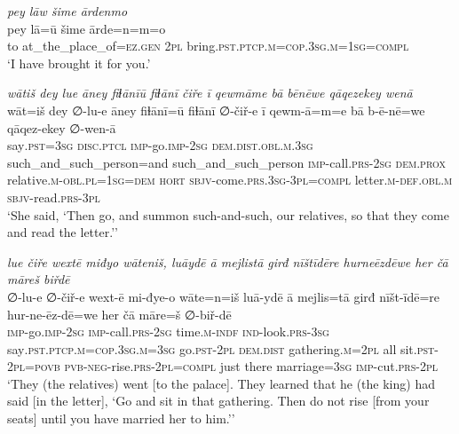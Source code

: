 \ea \label{KŠ.85}
\textit{pey lāw šime ārdenmo} \\ 
\gll pey lā=ū šime ārde=n=m=o \\ 
 to at\_the\_place\_of\textsc{\textsc{=ez.gen}} \textsc{2pl} bring\textsc{.pst}\textsc{.ptcp}\textsc{.m}\textsc{=cop}\textsc{.3sg}\textsc{.m}\textsc{=\textsc{1sg}}\textsc{=compl} \\ 
\glt `I have brought it for you.'
\z 
 
\ea \label{KŠ.86}
\textit{wātiš dey lue āney fiɫānīū fiɫānī čiře ī qewmāme bā bēnēwe qāqezekey wenā} \\ 
\gll wāt=iš dey ∅-lu-e āney fiɫānī=ū fiɫānī ∅-čiř-e ī qewm-ā=m=e bā b-ē-nē=we qāqez-ekey ∅-wen-ā \\ 
 say\textsc{.pst}\textsc{=3sg} \textsc{disc.ptcl} \textsc{imp-}go.\textsc{imp-}\textsc{2sg} \textsc{dem.dist}\textsc{.obl}\textsc{.m}\textsc{.3sg} such\_and\_such\_person=and such\_and\_such\_person \textsc{imp-}call\textsc{.prs}-\textsc{2sg} \textsc{dem.prox} relative\textsc{.m}\textsc{-obl}\textsc{.pl}\textsc{=\textsc{1sg}}\textsc{=dem} \textsc{hort} \textsc{sbjv-}come\textsc{.prs}\textsc{.3sg}\textsc{-3pl}\textsc{=compl} letter\textsc{.m}\textsc{-def}\textsc{.obl}\textsc{.m} \textsc{sbjv-}read\textsc{.prs}\textsc{-3pl} \\ 
\glt `She said, ‘Then go, and summon such-and-such, our relatives, so that they come and read the letter.’'
\z 
 
\ea \label{KŠ.87}
\textit{lue čiře wextē miđyo wāteniš, luāydē ā mejlistā girđ nīštīdēre hurneēzdēwe her čā māreš biřdē} \\ 
\gll ∅-lu-e ∅-čiř-e wext-ē mi-đye-o wāte=n=iš luā-ydē ā mejlis=tā girđ nīšt-īdē=re hur-ne-ēz-dē=we her čā māre=š ∅-biř-dē \\ 
 \textsc{imp-}go.\textsc{imp-}\textsc{2sg} \textsc{imp-}call\textsc{.prs}-\textsc{2sg} time\textsc{.m}\textsc{-indf} \textsc{ind-}look\textsc{.prs}\textsc{-3sg} say\textsc{.pst}\textsc{.ptcp}\textsc{.m}\textsc{=cop}\textsc{.3sg}\textsc{.m}\textsc{=3sg} go\textsc{.pst}-\textsc{2pl} \textsc{dem.dist} gathering\textsc{.m}=\textsc{2pl} all sit\textsc{.pst}-\textsc{2pl}\textsc{=\textsc{povb}} \textsc{pvb-}\textsc{neg-}rise\textsc{.prs}-\textsc{2pl}\textsc{=compl} just there marriage\textsc{=3sg} \textsc{imp-}cut\textsc{.prs}-\textsc{2pl} \\ 
\glt `They (the relatives) went [to the palace]. They learned that he (the king) had said [in the letter], ‘Go and sit in that gathering. Then do not rise [from your seats] until you have married her to him.’'
\z 
 
